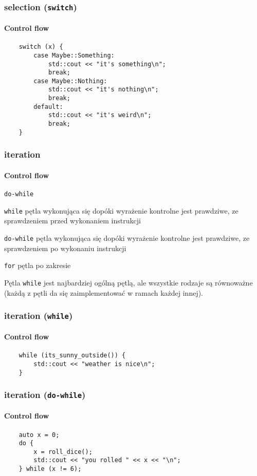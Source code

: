 \documentclass[aspectratio=169]{beamer}
\begin{document}
\begin{frame}[fragile]
    \frametitle{selection ({\tt switch})}
    \framesubtitle{Control flow}

    \begin{lstlisting}
    switch (x) {
        case Maybe::Something:
            std::cout << "it's something\n";
            break;
        case Maybe::Nothing:
            std::cout << "it's nothing\n";
            break;
        default:
            std::cout << "it's weird\n";
            break;
    }
    \end{lstlisting}
\end{frame}

\begin{frame}
    \frametitle{iteration}
    \framesubtitle{Control flow}

    \begin{labeling}{{\tt do-while}}
        \item[{\tt while}] pętla wykonująca się dopóki wyrażenie kontrolne jest
            prawdziwe, ze sprawdzeniem przed wykonaniem instrukcji
        \item[{\tt do-while}] pętla wykonująca się dopóki wyrażenie kontrolne
            jest prawdziwe, ze sprawdzeniem po wykonaniu instrukcji
        \item[{\tt for}] pętla po zakresie
    \end{labeling}

    \vspace{1em}

    Pętla {\tt while} jest najbardziej ogólną pętlą, ale wszystkie rodzaje są
    równoważne (każdą z pętli da się zaimplementować w ramach każdej innej).
\end{frame}

\begin{frame}[fragile]
    \frametitle{iteration ({\tt while})}
    \framesubtitle{Control flow}

    \begin{lstlisting}
    while (its_sunny_outside()) {
        std::cout << "weather is nice\n";
    }
    \end{lstlisting}
\end{frame}

\begin{frame}[fragile]
    \frametitle{iteration ({\tt do-while})}
    \framesubtitle{Control flow}

    \begin{lstlisting}
    auto x = 0;
    do {
        x = roll_dice();
        std::cout << "you rolled " << x << "\n";
    } while (x != 6);
    \end{lstlisting}
\end{frame}
\end{document}
